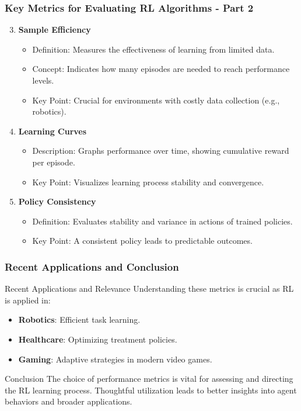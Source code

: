 \documentclass[aspectratio=169]{beamer}
\begin{document}
\begin{frame}[fragile]
    \frametitle{Key Metrics for Evaluating RL Algorithms - Part 2}
    \begin{enumerate}
        \setcounter{enumi}{2} %
        \item \textbf{Sample Efficiency}
            \begin{itemize}
                \item Definition: Measures the effectiveness of learning from limited data.
                \item Concept: Indicates how many episodes are needed to reach performance levels.
                \item Key Point: Crucial for environments with costly data collection (e.g., robotics).
            \end{itemize}

        \item \textbf{Learning Curves}
            \begin{itemize}
                \item Description: Graphs performance over time, showing cumulative reward per episode.
                \item Key Point: Visualizes learning process stability and convergence.
            \end{itemize}

        \item \textbf{Policy Consistency}
            \begin{itemize}
                \item Definition: Evaluates stability and variance in actions of trained policies.
                \item Key Point: A consistent policy leads to predictable outcomes.
            \end{itemize}
    \end{enumerate}
\end{frame}

\begin{frame}[fragile]
    \frametitle{Recent Applications and Conclusion}
    \begin{block}{Recent Applications and Relevance}
        Understanding these metrics is crucial as RL is applied in:
        \begin{itemize}
            \item \textbf{Robotics}: Efficient task learning.
            \item \textbf{Healthcare}: Optimizing treatment policies.
            \item \textbf{Gaming}: Adaptive strategies in modern video games.
        \end{itemize}
    \end{block}

    \begin{block}{Conclusion}
        The choice of performance metrics is vital for assessing and directing the RL learning process. Thoughtful utilization leads to better insights into agent behaviors and broader applications.
    \end{block}
\end{frame}
\end{document}
